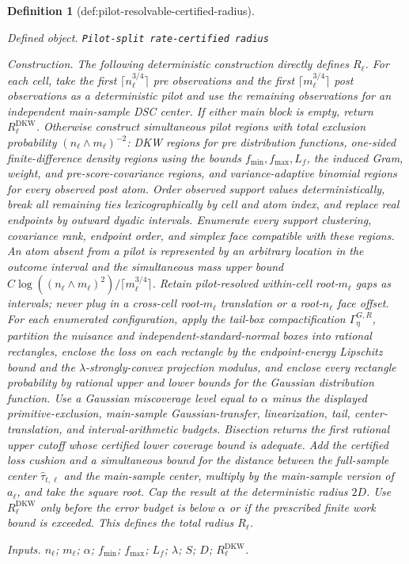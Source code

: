 \documentclass{article}
\newtheorem{definition}{Definition}
\begin{document}
\begin{definition}[def:pilot-resolvable-certified-radius]\label{def:pilot-resolvable-certified-radius}
\par\smallskip\noindent\emph{Defined object.} \texttt{Pilot-\allowbreak{}split rate-\allowbreak{}certified radius}
\par\smallskip\noindent\emph{Construction.} The following deterministic construction directly defines \(R_\ell\).
For each cell, take the first \(\lceil n_\ell^{3/4}\rceil\) pre observations and the first \(\lceil m_\ell^{3/4}\rceil\) post observations as a deterministic pilot and use the remaining observations for an independent main-sample DSC center.  If either main block is empty, return \(R^{\mathrm{DKW}}_\ell\).  Otherwise construct simultaneous pilot regions with total exclusion probability \((n_\ell\wedge m_\ell)^{-2}\): DKW regions for pre distribution functions, one-sided finite-difference density regions using the bounds \(f_{\min},f_{\max},L_f\), the induced Gram, weight, and pre-score-covariance regions, and variance-adaptive binomial regions for every observed post atom.  Order observed support values deterministically, break all remaining ties lexicographically by cell and atom index, and replace real endpoints by outward dyadic intervals.  Enumerate every support clustering, covariance rank, endpoint order, and simplex face compatible with these regions.  An atom absent from a pilot is represented by an arbitrary location in the outcome interval and the simultaneous mass upper bound \(C\log((n_\ell\wedge m_\ell)^2)/\lceil m_\ell^{3/4}\rceil\).  Retain pilot-resolved within-cell root-\(m_\ell\) gaps as intervals; never plug in a cross-cell root-\(m_\ell\) translation or a root-\(n_\ell\) face offset.  For each enumerated configuration, apply the tail-box compactification \(\Gamma_\eta^{G,R}\), partition the nuisance and independent-standard-normal boxes into rational rectangles, enclose the loss on each rectangle by the endpoint-energy Lipschitz bound and the \(\lambda\)-strongly-convex projection modulus, and enclose every rectangle probability by rational upper and lower bounds for the Gaussian distribution function.  Use a Gaussian miscoverage level equal to \(\alpha\) minus the displayed primitive-exclusion, main-sample Gaussian-transfer, linearization, tail, center-translation, and interval-arithmetic budgets.  Bisection returns the first rational upper cutoff whose certified lower coverage bound is adequate.  Add the certified loss cushion and a simultaneous bound for the distance between the full-sample center \(\widehat\tau_{t,\ell}\) and the main-sample center, multiply by the main-sample version of \(a_\ell\), and take the square root.  Cap the result at the deterministic radius \(2D\).  Use \(R^{\mathrm{DKW}}_\ell\) only before the error budget is below \(\alpha\) or if the prescribed finite work bound is exceeded.  This defines the total radius \(R_\ell\).
\par\smallskip\noindent\emph{Inputs.} \(n_\ell\); \(m_\ell\); \(\alpha\); \(f_{\min}\); \(f_{\max}\); \(L_f\); \(\lambda\); \(S\); \(D\); \(R^{\mathrm{DKW}}_\ell\).
\end{definition}
\end{document}
